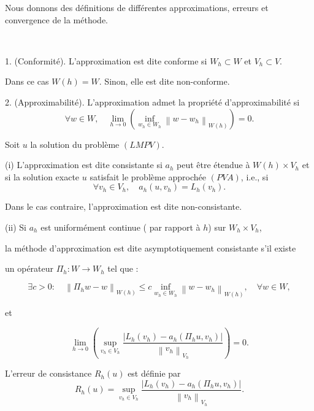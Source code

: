 Nous donnons des définitions de différentes approximations,  erreurs et convergence de la méthode.


\begin{definition}\
	
	1. (Conformité). L'approximation est dite  conforme   si  $W_{h} \subset W$  et  $V_{h} \subset V$. 
	
	Dans ce cas $W(h)=W$.   Sinon, elle est dite non-conforme.


2. (Approximabilité). L'approximation admet  la propriété d'approximabilité si 
$$
\forall w \in W, \quad \lim _{h \rightarrow 0}\left(\inf _{w_{h} \in W_{h}}\left\|w-w_{h}\right\|_{W(h)}\right)=0. 
$$

\end{definition}


\begin{definition}  Soit $u$ la solution du problème  $(LMPV)$.
	
(i) L'approximation est dite consistante  si  $a_{h}$ peut être étendue à $W(h) \times V_{h}$ et si la solution exacte $u$ satisfait  le problème approchée $(PVA)$, i.e., si
$$
\forall v_{h} \in V_{h}, \quad a_{h}\left(u, v_{h}\right)=L_{h}\left(v_{h}\right). 
$$

Dans le cas contraire,  l'approximation est dite non-consistante.

(ii) Si  $a_{h}$ est  uniformément  continue ( par rapport à $h$)  sur  $W_{h} \times V_{h}$, 

la méthode d'approximation est dite 
asymptotiquement  consistante s'il existe 

un  opérateur 
$\Pi_{h}: W \rightarrow W_{h}$ tel que : 


$$
\exists c>0: \quad \left\|\Pi_{h} w-w\right\|_{W(h)} \leq c \inf _{w_{h} \in W_{h}}\left\|w-w_{h}\right\|_{W(h)}, \quad \forall w \in W, 
$$ 

et 

$$
\lim _{h \rightarrow 0}\left(\sup _{v_{h} \in V_{h}} \frac{\left|L_{h}\left(v_{h}\right)-a_{h}\left(\Pi_{h} u, v_{h}\right)\right|}{\left\|v_{h}\right\|_{V_{h}}}\right)=0.
$$


L'erreur de consistance  $R_{h}(u)$ est définie par 
$$
R_{h}(u)=\sup _{v_{h} \in V_{h}} \frac{\left|L_{h}\left(v_{h}\right)-a_{h}\left(\Pi_{h} u, v_{h}\right)\right|}{\left\|v_{h}\right\|_{V_{h}}}.
$$

\end{definition}



